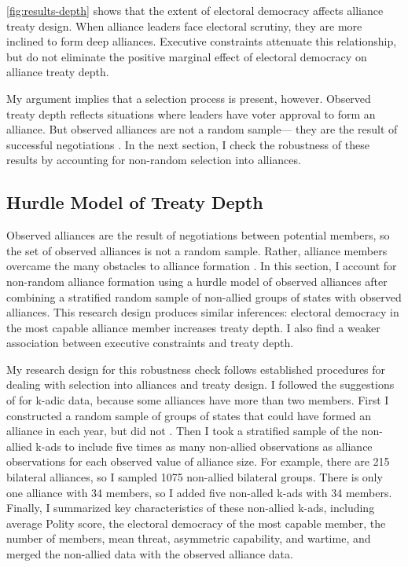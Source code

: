 \documentclass[12pt]{article}
\begin{document}
\autoref{fig:results-depth} shows that the extent of electoral democracy affects alliance treaty design.
When alliance leaders face electoral scrutiny, they are more inclined to form deep alliances. 
Executive constraints attenuate this relationship, but do not eliminate the positive marginal effect of electoral democracy on alliance treaty depth. 


My argument implies that a selection process is present, however. 
Observed treaty depth reflects situations where leaders have voter approval to form an alliance.
But observed alliances are not a random sample--- they are the result of successful negotiations \citep{Poast2019a}. 
In the next section, I check the robustness of these results by accounting for non-random selection into alliances. 


\subsection{Hurdle Model of Treaty Depth} 


Observed alliances are the result of negotiations between potential members, so the set of observed alliances is not a random sample.
Rather, alliance members overcame the many obstacles to alliance formation \citep{Poast2019a}.  
In this section, I account for non-random alliance formation using a hurdle model of observed alliances after combining a stratified random sample of non-allied groups of states with observed alliances. 
This research design produces similar inferences: electoral democracy in the most capable alliance member increases treaty depth. 
I also find a weaker association between executive constraints and treaty depth. 


My research design for this robustness check follows established procedures for dealing with selection into alliances and treaty design. 
I followed the suggestions of \citet{Poast2010} for k-adic data, because some alliances have more than two members. 
First I constructed a random sample of groups of states that could have formed an alliance in each year, but did not \citep{FordhamPoast2014}.
Then I took a stratified sample of the non-allied k-ads to include five times as many non-allied observations as alliance observations for each observed value of alliance size. 
For example, there are 215 bilateral alliances, so I sampled 1075 non-allied bilateral groups. 
There is only one alliance with 34 members, so I added five non-alled k-ads with 34 members. 
Finally, I summarized key characteristics of these non-allied k-ads, including average Polity score, the electoral democracy of the most capable member, the number of members, mean threat, asymmetric capability, and wartime, and merged the non-allied data with the observed alliance data. 
\end{document}
